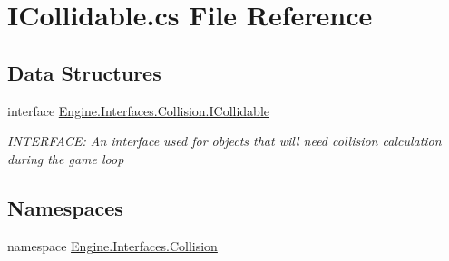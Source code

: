 \hypertarget{a00101}{}\section{I\+Collidable.\+cs File Reference}
\label{a00101}
\subsection*{Data Structures}
\begin{DoxyCompactItemize}
\item 
interface \hyperlink{a00426}{Engine.\+Interfaces.\+Collision.\+I\+Collidable}
\begin{DoxyCompactList}\small\item\em I\+N\+T\+E\+R\+F\+A\+CE\+: An interface used for objects that will need collision calculation during the game loop \end{DoxyCompactList}\end{DoxyCompactItemize}
\subsection*{Namespaces}
\begin{DoxyCompactItemize}
\item 
namespace \hyperlink{a00255}{Engine.\+Interfaces.\+Collision}
\end{DoxyCompactItemize}
